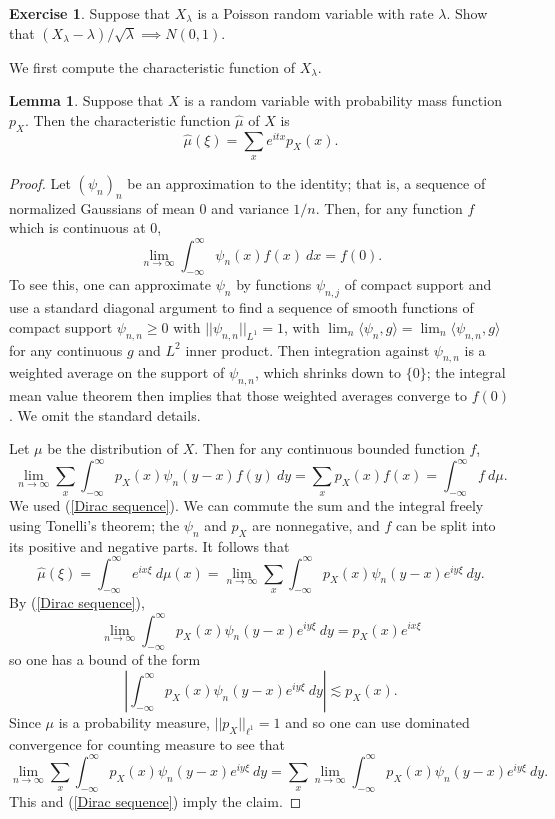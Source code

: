 \documentclass[10pt]{article}
\theoremstyle{definition}
\newtheorem{exer}{Exercise}
\newtheorem{lemma}{Lemma}[exer]
\begin{document}
\begin{exer}
Suppose that $X_\lambda$ is a Poisson random variable with rate $\lambda$.
Show that $(X_\lambda - \lambda)/\sqrt \lambda \implies N(0, 1)$.
\end{exer}

We first compute the characteristic function of $X_\lambda$.
\begin{lemma}
Suppose that $X$ is a random variable with probability mass function $p_X$. Then the characteristic function $\hat \mu$ of $X$ is
$$\hat \mu(\xi) = \sum_x e^{itx} p_X(x).$$
\end{lemma}
\begin{proof}
Let $(\psi_n)_n$ be an approximation to the identity; that is, a sequence of normalized Gaussians of mean $0$ and variance $1/n$.
Then, for any function $f$ which is continuous at $0$,
\begin{equation}
\label{Dirac sequence}
\lim_{n \to \infty} \int_{-\infty}^\infty \psi_n(x) f(x)~dx = f(0).
\end{equation}
To see this, one can approximate $\psi_n$ by functions $\psi_{n,j}$ of compact support and use a standard diagonal argument to find a sequence of smooth functions of compact support $\psi_{n,n} \geq 0$ with $||\psi_{n,n}||_{L^1} = 1$, with $\lim_n \langle \psi_n, g\rangle = \lim_n \langle \psi_{n,n}, g\rangle$ for any continuous $g$ and $L^2$ inner product.
Then integration against $\psi_{n,n}$ is a weighted average on the support of $\psi_{n,n}$, which shrinks down to $\{0\}$; the integral mean value theorem then implies that those weighted averages converge to $f(0)$.
We omit the standard details.

Let $\mu$ be the distribution of $X$. Then for any continuous bounded function $f$,
$$\lim_{n \to \infty} \sum_x \int_{-\infty}^\infty p_X(x) \psi_n(y - x) f(y)~dy = \sum_x p_X(x) f(x) = \int_{-\infty}^\infty f~d\mu.$$
We used (\ref{Dirac sequence}).
We can commute the sum and the integral freely using Tonelli's theorem; the $\psi_n$ and $p_X$ are nonnegative, and $f$ can be split into its positive and negative parts.
It follows that
$$\hat \mu(\xi) = \int_{-\infty}^\infty e^{ix\xi}~d\mu(x) = \lim_{n \to \infty} \sum_x \int_{-\infty}^\infty p_X(x) \psi_n(y - x) e^{iy\xi}~dy.$$
By (\ref{Dirac sequence}),
$$\lim_{n \to \infty} \int_{-\infty}^\infty p_X(x) \psi_n(y - x) e^{iy\xi}~dy = p_X(x) e^{ix\xi}$$
so one has a bound of the form
$$\left|\int_{-\infty}^\infty p_X(x) \psi_n(y - x) e^{iy\xi}~dy\right| \lesssim p_X(x).$$
Since $\mu$ is a probability measure, $||p_X||_{\ell^1} = 1$ and so one can use dominated convergence for counting measure to see that
$$\lim_{n \to \infty} \sum_x \int_{-\infty}^\infty p_X(x) \psi_n(y - x) e^{iy\xi}~dy = \sum_x \lim_{n \to \infty} \int_{-\infty}^\infty p_X(x) \psi_n(y - x) e^{iy\xi}~dy.$$
This and (\ref{Dirac sequence}) imply the claim.
\end{proof}
\end{document}
